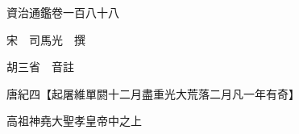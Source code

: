 










 


 
 


 

  
  
  
  
  





  
  
  
  
  
 
  

  

  
  
  



  

 
 

  
   




  

  
  


  　　資治通鑑卷一百八十八

　　宋　司馬光　撰

　　胡三省　音註

　　唐紀四【起屠維單閼十二月盡重光大荒落二月凡一年有奇】

　　高祖神堯大聖孝皇帝中之上

